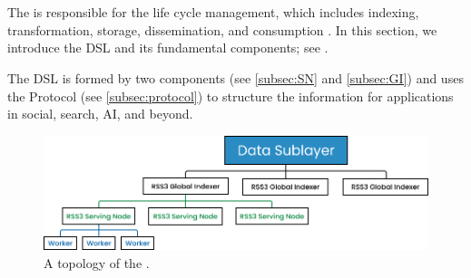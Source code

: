 \section{}
\label{sec:DSL}

The  is responsible for the  life cycle management, which includes indexing, transformation, storage, dissemination, and consumption \cite{nationalinstituteofstandardsandtechnology2016Information}.
In this section, we introduce the \gls{DSL} and its fundamental components; see .

The \gls{DSL} is formed by two components (see \cref{subsec:SN} and \cref{subsec:GI}) and uses the \gls{Protocol} (see \cref{subsec:protocol}) to structure the information for applications in social, search, AI, and beyond.

    {
        \begin{figure}[tb!]
            \centering
            \includegraphics[width=\columnwidth]{figures/DSL.png}
            \caption{A topology of the .}
            \label{fig:DSL}
        \end{figure}
    }



